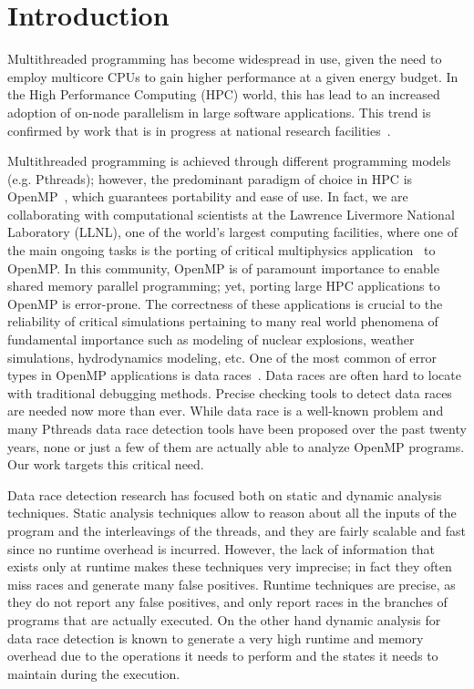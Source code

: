 \section{Introduction}
\label{sec:introduction}

Multithreaded programming has become widespread in use, given the need to
employ multicore CPUs to gain higher performance at a given energy budget.
%
In the High Performance Computing (HPC) world, this has lead to an increased
adoption of on-node parallelism in large software applications.
%
This trend is confirmed by work that is in progress at national research
facilities~\cite{sierra, summit, trinity}.


Multithreaded programming is achieved through different programming models
(e.g. Pthreads); however, the predominant paradigm of choice in HPC is
OpenMP~\cite{ompdoc}, which guarantees portability and ease of use.
%
In fact, we are collaborating with computational scientists at the Lawrence
Livermore National Laboratory (LLNL), one of the world's largest computing
facilities, where one of the main ongoing tasks is the porting of critical
multiphysics application~\cite{llnl-apps} to OpenMP.
%
In this community, OpenMP is of paramount importance to enable shared memory
parallel programming; yet, porting large HPC applications to OpenMP is
error-prone.
%
The correctness of these applications is crucial to the reliability of
critical simulations pertaining to many real world phenomena of fundamental
importance such as modeling of nuclear explosions, weather simulations,
hydrodynamics modeling, etc.
%
One of the most common of error types in OpenMP applications is data
races~\cite{sus_common_2008}.
%
Data races are often hard to locate with traditional debugging methods.
%
Precise checking tools to detect data races are needed now more than ever.
%
While data race is a well-known problem and many Pthreads data race detection
tools have been proposed over the past twenty years, none or just a few of
them are actually able to analyze OpenMP programs.
%
Our work targets this critical need.

Data race detection research has focused both on static and dynamic analysis
techniques.
%
Static analysis techniques allow to reason about all the inputs of the program
and the interleavings of the threads, and they are fairly scalable and fast
since no runtime overhead is incurred.
%
However, the lack of information that exists only at runtime makes these
techniques very imprecise; in fact they often miss races and generate many
false positives.
%
Runtime techniques are precise, as they do not report any false positives, and
only report races in the branches of programs that are actually executed.
%
On the other hand dynamic analysis for data race detection is known to
generate a very high runtime and memory overhead due to the operations it
needs to perform and the states it needs to maintain during the execution.

